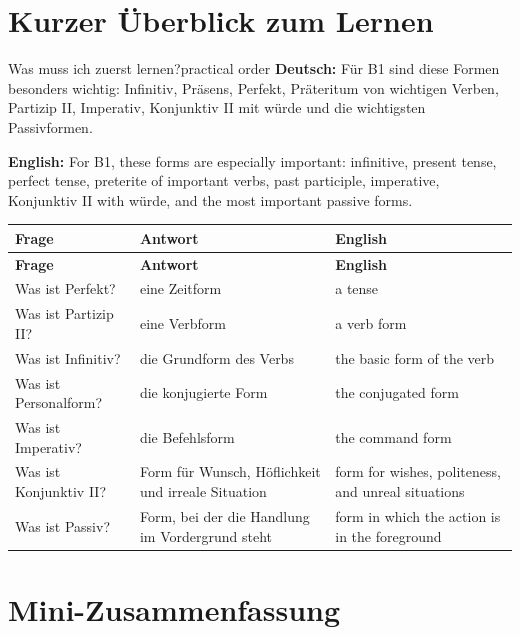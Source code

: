 \documentclass[a4paper,11pt]{article}
\newcommand{\GermanText}[1]{\textbf{Deutsch: }#1\par}
\newcommand{\EnglishText}[1]{{\small\color{SoftGray}\textbf{English: }#1\par}}
\begin{document}
\section{Kurzer Überblick zum Lernen}

\begin{grammarentry}{Was muss ich zuerst lernen?}{practical order}
\GermanText{Für B1 sind diese Formen besonders wichtig: Infinitiv, Präsens, Perfekt, Präteritum von wichtigen Verben, Partizip II, Imperativ, Konjunktiv II mit würde und die wichtigsten Passivformen.}
\EnglishText{For B1, these forms are especially important: infinitive, present tense, perfect tense, preterite of important verbs, past participle, imperative, Konjunktiv II with würde, and the most important passive forms.}
\end{grammarentry}

\begin{longtable}{L{4cm}L{5.5cm}L{5.5cm}}
\color{white}\textbf{Frage} & \color{white}\textbf{Antwort} & \color{white}\textbf{English} \\
\endfirsthead
{}
\color{white}\textbf{Frage} & \color{white}\textbf{Antwort} & \color{white}\textbf{English} \\
\endhead
Was ist Perfekt? & eine Zeitform & a tense \\
Was ist Partizip II? & eine Verbform & a verb form \\
Was ist Infinitiv? & die Grundform des Verbs & the basic form of the verb \\
Was ist Personalform? & die konjugierte Form & the conjugated form \\
Was ist Imperativ? & die Befehlsform & the command form \\
Was ist Konjunktiv II? & Form für Wunsch, Höflichkeit und irreale Situation & form for wishes, politeness, and unreal situations \\
Was ist Passiv? & Form, bei der die Handlung im Vordergrund steht & form in which the action is in the foreground \\
\end{longtable}

\section{Mini-Zusammenfassung}
\end{document}
